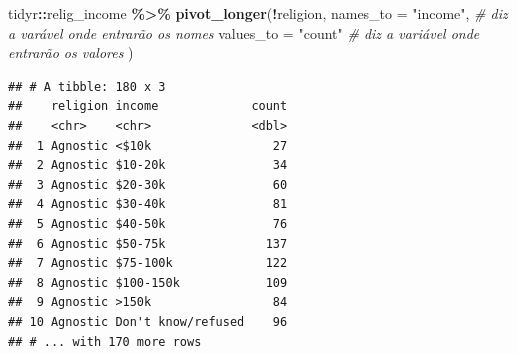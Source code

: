 \documentclass[
  9pt,
  ignorenonframetext,
]{beamer}
\newenvironment{Shaded}{\begin{snugshade}}{\end{snugshade}}
\newcommand{\CommentTok}[1]{\textcolor[rgb]{0.56,0.35,0.01}{\textit{#1}}}
\newcommand{\DataTypeTok}[1]{\textcolor[rgb]{0.13,0.29,0.53}{#1}}
\newcommand{\KeywordTok}[1]{\textcolor[rgb]{0.13,0.29,0.53}{\textbf{#1}}}
\newcommand{\NormalTok}[1]{#1}
\newcommand{\OperatorTok}[1]{\textcolor[rgb]{0.81,0.36,0.00}{\textbf{#1}}}
\newcommand{\StringTok}[1]{\textcolor[rgb]{0.31,0.60,0.02}{#1}}
\begin{document}
\begin{frame}[fragile]{}
\protect\hypertarget{section}{}
\begin{Shaded}
\begin{Highlighting}[]
\NormalTok{tidyr}\OperatorTok{::}\NormalTok{relig\_income }\OperatorTok{\%\textgreater{}\%}
\StringTok{  }\KeywordTok{pivot\_longer}\NormalTok{(}\OperatorTok{!}\NormalTok{religion, }
               \DataTypeTok{names\_to =} \StringTok{"income"}\NormalTok{, }\CommentTok{\# diz a varável onde entrarão os nomes}
               \DataTypeTok{values\_to =} \StringTok{"count"} \CommentTok{\# diz a variável onde entrarão os valores}
\NormalTok{               )}
\end{Highlighting}
\end{Shaded}

\begin{verbatim}
## # A tibble: 180 x 3
##    religion income             count
##    <chr>    <chr>              <dbl>
##  1 Agnostic <$10k                 27
##  2 Agnostic $10-20k               34
##  3 Agnostic $20-30k               60
##  4 Agnostic $30-40k               81
##  5 Agnostic $40-50k               76
##  6 Agnostic $50-75k              137
##  7 Agnostic $75-100k             122
##  8 Agnostic $100-150k            109
##  9 Agnostic >150k                 84
## 10 Agnostic Don't know/refused    96
## # ... with 170 more rows
\end{verbatim}
\end{frame}
\end{document}
